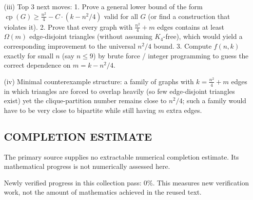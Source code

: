 (iii) Top 3 next moves:
1. Prove a general lower bound of the form $\operatorname{cp}(G)\ge \frac{n^2}{4}-C\cdot (k-n^2/4)$ valid for all $G$ (or find a construction that violates it).
2. Prove that every graph with $\frac{n^2}{4}+m$ edges contains at least $\Omega(m)$ edge-disjoint triangles (without assuming $K_4$-free), which would yield a corresponding improvement to the universal $n^2/4$ bound.
3. Compute $f(n,k)$ exactly for small $n$ (say $n\le 9$) by brute force / integer programming to guess the correct dependence on $m=k-n^2/4$.

(iv) Minimal counterexample structure: a family of graphs with $k=\frac{n^2}{4}+m$ edges in which triangles are forced to overlap heavily (so few edge-disjoint triangles exist) yet the clique-partition number remains close to $n^2/4$; such a family would have to be very close to bipartite while still having $m$ extra edges.




\subsection*{COMPLETION ESTIMATE}
The primary source supplies no extractable numerical completion estimate. Its mathematical progress is not numerically assessed here.

Newly verified progress in this collection pass: $0\%$. This measures new verification work, not the amount of mathematics achieved in the reused text.
